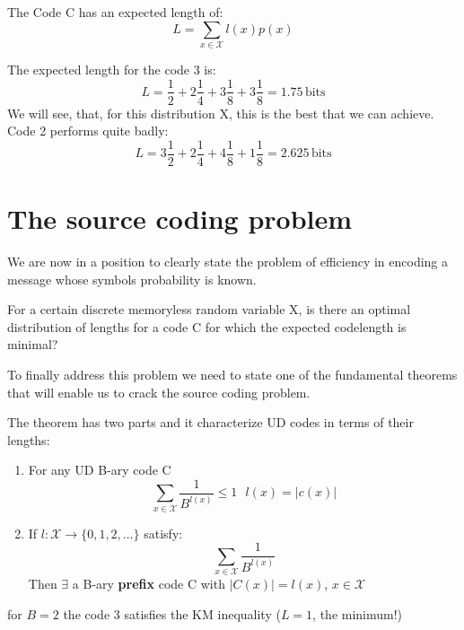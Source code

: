 \begin{definition}
	The Code C has an expected length of: 
	\begin{equation}	\label{eq:expectedlength}
	L = \sum_{x \in \mathcal{X}}l(x)p(x)
	\end{equation}
\end{definition} 

\begin{example}
	The expected length for the code 3 is:
	$$ L = \frac{1}{2} + 2\frac{1}{4} + 3\frac{1}{8} + 3\frac{1}{8} = 1.75 \, \text{bits}$$
	We will see, that, for this distribution X, this is the best that we can achieve. \newline
Code 2 performs quite badly:
	$$ L = 3\frac{1}{2} + 2\frac{1}{4} + 4\frac{1}{8} + 1\frac{1}{8} = 2.625\, \text{bits}$$
\end{example}

\section{The source coding problem}
We are now in a position to clearly state the problem of efficiency in encoding a message whose symbols probability is known. \newline
\begin{question}
For a certain discrete memoryless random variable X, is there an optimal distribution of lengths for a code C for which the expected codelength is minimal?
\end{question}
To finally address this problem we need to state one of the fundamental theorems that will enable us to crack the source coding problem.
	
\begin{theorem}
	The theorem has two parts and it characterize UD codes in terms of their lengths:
	\begin{enumerate}
		\item For any UD B-ary code C
			$$\sum_{x \in \mathcal{X}} \frac{1}{B^{l(x)}} \le 1 \,\,\,\, l(x) = |c(x)|$$
		\item If $l: \mathcal{X} \longrightarrow \{0,1,2,\dots\}$ satisfy:
		$$\sum_{x \in \mathcal{X}} \frac{1}{B^{l(x)}}$$
		Then $\exists$ a B-ary \textbf{prefix} code C with $|C(x)| = l(x)$, $x \in \mathcal{X}$
	\end{enumerate}
\end{theorem}

\begin{example}
	for $B=2$ the code 3 satisfies the KM inequality ($L = 1$, the minimum!) 
\end{example}

